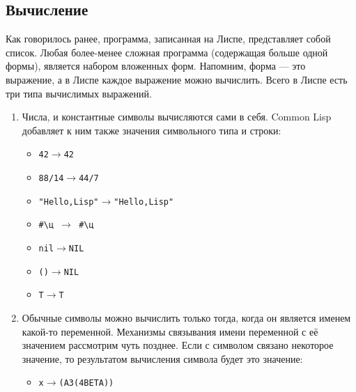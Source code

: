 \documentclass[a4paper, 12pt, titlepage, twoside]{article}
\begin{document}
\subsection{Вычисление}
Как говорилось ранее, программа, записанная на Лиспе, представляет собой список. Любая более-менее сложная программа (содержащая больше одной формы), является набором вложенных форм. Напомним, форма --- это выражение, а в Лиспе каждое выражение можно вычислить. Всего в Лиспе есть три типа вычислимых выражений.
\begin{enumerate}
\item Числа, и константные символы вычисляются сами в себя. Common Lisp добавляет к ним также значения символьного типа и строки:
  \begin{itemize}
  \item[] \begin{alltt}42 \(\longrightarrow\) 42\end{alltt}
  \item[] \begin{alltt}88/14 \(\longrightarrow\) 44/7\end{alltt}
  \item[] \begin{alltt}"Hello, Lisp" \(\longrightarrow\) "Hello, Lisp"\end{alltt}
  \item[] \texttt{\#\textbackslash{}ц $\longrightarrow$ \#\textbackslash{}ц}
  \item[] \begin{alltt}nil \(\longrightarrow\) NIL\end{alltt}
  \item[] \begin{alltt}() \(\longrightarrow\) NIL\end{alltt}
  \item[] \begin{alltt}T \(\longrightarrow\) T\end{alltt}
  \end{itemize}
\item Обычные символы можно вычислить только тогда, когда он является именем какой-то переменной. Механизмы связывания имени переменной с её значением рассмотрим чуть позднее. Если с символом связано некоторое значение, то результатом вычисления символа будет это значение:
  \begin{itemize}
  \item[] \begin{alltt} x \(\longrightarrow\) (A 3 (4 BETA))\end{alltt}

\end{itemize}
\end{enumerate}
\end{document}
